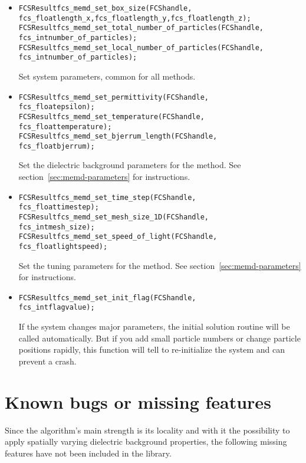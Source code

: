 \begin{itemize}
\item
\begin{alltt}
FCSResult fcs_memd_set_box_size(FCS handle,
    fcs_float length_x, fcs_float length_y, fcs_float length_z);
FCSResult fcs_memd_set_total_number_of_particles(FCS handle,
    fcs_int number_of_particles);
FCSResult fcs_memd_set_local_number_of_particles(FCS handle,
    fcs_int number_of_particles);
\end{alltt}
    Set system parameters, common for all methods.
\item
\begin{alltt}
FCSResult fcs_memd_set_permittivity(FCS handle,
    fcs_float epsilon);
FCSResult fcs_memd_set_temperature(FCS handle,
    fcs_float temperature);
FCSResult fcs_memd_set_bjerrum_length(FCS handle,
    fcs_float bjerrum);
\end{alltt}
    Set the dielectric background parameters for the method. See section~\ref{sec:memd-parameters} for instructions.

\item
\begin{alltt}
FCSResult fcs_memd_set_time_step(FCS handle,
    fcs_float timestep);
FCSResult fcs_memd_set_mesh_size_1D(FCS handle,
    fcs_int mesh_size);
FCSResult fcs_memd_set_speed_of_light(FCS handle,
    fcs_float lightspeed);
\end{alltt}
    Set the tuning parameters for the method. See section~\ref{sec:memd-parameters} for instructions.
\item
\begin{alltt}    
FCSResult fcs_memd_set_init_flag(FCS handle,
    fcs_int flagvalue);
\end{alltt}
    If the system changes major parameters, the initial solution routine will be called automatically. But if you add small particle numbers or change particle positions rapidly, this function will tell \memd{} to re-initialize the system and can prevent a crash.
\end{itemize}

\section{Known bugs or missing features}

Since the algorithm's main strength is its locality and with it the possibility to apply spatially varying dielectric background properties, the following missing features have not been included in the \project{} library.

